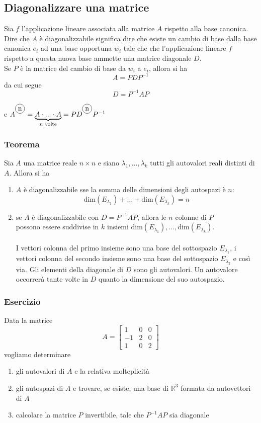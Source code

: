 \documentclass[italian]{article}
\newcommand{\ins}[1]{\text{$\mathbb{#1}$}}
\renewcommand{\dim}[1]{\text{dim$\left(#1\right)$}}
\newcommand\encircle[1]{%
	\tikz[baseline=(X.base)] 
	\node (X) [draw, shape=circle, inner sep=0] {\strut #1};}
\begin{document}
\newpage
\subsection{Diagonalizzare una matrice}
Sia $f$ l'applicazione lineare associata alla matrice $A$ rispetto alla base canonica. Dire che $A$ è diagonalizzabile significa dire che esiste un cambio di base dalla base canonica $e_i$ ad una base opportuna $w_i$ tale che che l'applicazione lineare $f$ rispetto a questa nuova base ammette una matrice diagonale $D$.\\
Se $P$ è la matrice del cambio di base da $w_i$ a $e_i$, allora si ha
\[
	A = PDP^{-1}
\]
da cui segue 
\[
	D = P^{-1}AP
\]

e $A^{^{\encircle{n}}} = \underbrace{A \cdot ... \cdot A}_{\text{$n$ volte}} = PD^{^{\encircle{n}}}P^{-1}$

\subsubsection{Teorema}
Sia $A$ una matrice reale $n \times n$ e siano $\lambda_1, ..., \lambda_k$ tutti gli autovalori reali distinti di $A$. Allora si ha
\begin{enumerate}[label=(\roman*)]
	\item $A$ è diagonalizzabile sse la somma delle dimensioni degli autospazi è $n$:
		\[
			\dim{E_{\lambda_1}} + \dots + \dim{E_{\lambda_k}} = n
		\]
	\item se $A$ è diagonalizzabile con $D=P^{-1}AP$, allora le $n$ colonne di $P$ \\ possono essere suddivise in $k$ insiemi $\dim{E_{\lambda_1}}, \dots, \dim{E_{\lambda_k}}$.\\\\
	I vettori colonna del primo insieme sono una base del sottospazio $E_{\lambda_1}$, i vettori colonna del secondo insieme sono una base del sottospazio $E_{\lambda_2}$ e così via. Gli elementi della diagonale di $D$ sono gli autovalori. Un autovalore occorrerà tante volte in $D$ quanto la dimensione del suo autospazio.
\end{enumerate}

\subsubsection{Esercizio}
Data la matrice 
\[
	A = 
	\begin{bmatrix}
		1 & 0 & 0 \\
		-1 & 2 & 0 \\
		1 & 0 & 2
	\end{bmatrix}
\]
vogliamo determinare
\begin{enumerate}[noitemsep,topsep=5pt,label=\alph*)]
	\item gli autovalori di $A$ e la relativa molteplicità
	\item gli autospazi di $A$ e trovare, se esiste, una base di $\ins{R}^3$ formata da autovettori di $A$
	\item calcolare la matrice $P$ invertibile, tale che $P^{-1}AP$ sia diagonale
\end{enumerate}
\end{document}
